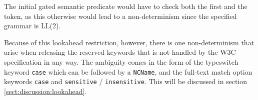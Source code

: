 The initial gated semantic predicate would have to check both the first and the token, as this otherwise would lead to a non-determinism since the specified grammar is LL(2).

Because of this lookahead restriction, however, there is one non-determinism that arise when releasing the reserved keywords that is not handled by the W3C specification in any way. The ambiguity comes in the form of the typeswitch keyword \verb!case! which can be followed by a \verb!NCName!, and the full-text match option keywords \verb!case! and \verb!sensitive! / \verb!insensitive!. This will be discussed in section \ref{sect:discussion:lookahead}.
